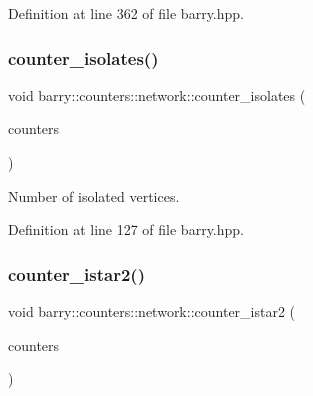 Definition at line 362 of file barry.\+hpp.

\mbox{\label{namespacebarry_1_1counters_1_1network_a16449353394312feed59aa5444d17dad}} 
\subsubsection{\texorpdfstring{counter\+\_\+isolates()}{counter\_isolates()}}
{\footnotesize\ttfamily void barry\+::counters\+::network\+::counter\+\_\+isolates (\begin{DoxyParamCaption}\item[{\hyperlink{namespacebarry_1_1counters_1_1network_a3b3c590303d47840d1967372ae495d95}{Net\+Counter\+Vector} $\ast$}]{counters }\end{DoxyParamCaption})\hspace{0.3cm}{\ttfamily [inline]}}



Number of isolated vertices. 



Definition at line 127 of file barry.\+hpp.

\mbox{\label{namespacebarry_1_1counters_1_1network_a95eea8464d85c595efa305cdf9a5a82b}} 
\subsubsection{\texorpdfstring{counter\+\_\+istar2()}{counter\_istar2()}}
{\footnotesize\ttfamily void barry\+::counters\+::network\+::counter\+\_\+istar2 (\begin{DoxyParamCaption}\item[{\hyperlink{namespacebarry_1_1counters_1_1network_a3b3c590303d47840d1967372ae495d95}{Net\+Counter\+Vector} $\ast$}]{counters }\end{DoxyParamCaption})\hspace{0.3cm}{\ttfamily [inline]}}



